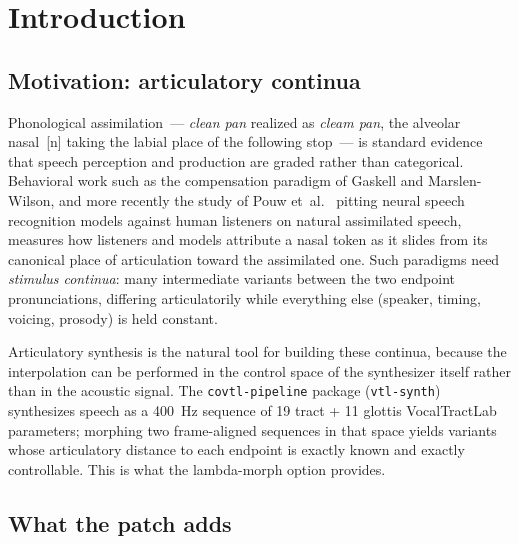 \documentclass[11pt,a4paper]{article}
\newcommand{\code}[1]{\texttt{#1}}
\begin{document}

\begingroup
\hypersetup{linkcolor=black}
\tableofcontents
\endgroup
\newpage

\section{Introduction}\label{sec:intro}

\subsection{Motivation: articulatory continua}

Phonological assimilation~--- \emph{clean pan} realized as
\emph{cleam pan}, the alveolar nasal~[n] taking the labial place of
the following stop~--- is standard evidence that speech perception
and production are graded rather than categorical.  Behavioral work
such as the compensation paradigm of Gaskell and Marslen-Wilson, and
more recently the study of Pouw et~al.~\citep{pouw2024} pitting neural speech
recognition models against human listeners on natural assimilated
speech, measures how
listeners and models attribute a nasal token as it slides from its
canonical place of articulation toward the assimilated one.  Such
paradigms need \emph{stimulus continua}: many intermediate variants
between the two endpoint pronunciations, differing articulatorily
while everything else (speaker, timing, voicing, prosody) is held
constant.

Articulatory synthesis is the natural tool for building these
continua, because the interpolation can be performed in the control
space of the synthesizer itself rather than in the acoustic signal.
The \code{covtl-pipeline} package (\code{vtl-synth}) synthesizes
speech as a 400~Hz sequence of 19 tract + 11 glottis
VocalTractLab parameters; morphing two frame-aligned sequences in
that space yields variants whose articulatory distance to each
endpoint is exactly known and exactly controllable.  This is what
the lambda-morph option provides.

\subsection{What the patch adds}
\end{document}
